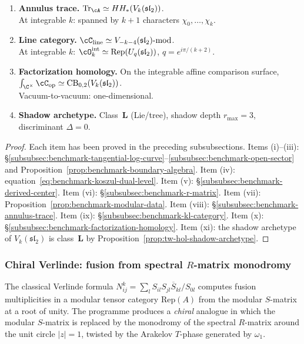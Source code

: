 \begin{theorem}
\begin{enumerate}[label=\textup{(\roman*)},nosep]
\item \textbf{Annulus trace.}
 $\mathrm{Tr}_\cA \simeq HH_*(V_k(\mathfrak{sl}_2))$.\\
 At integrable $k$: spanned by $k + 1$ characters
 $\chi_0, \ldots, \chi_k$.

\item \textbf{Line category.}
 $\cC_{\mathrm{line}} \simeq V_{-k-4}(\mathfrak{sl}_2)\text{-mod}$.\\
 At integrable $k$:
 $\cO_k^{\mathrm{int}} \simeq
 \mathrm{Rep}(U_q(\mathfrak{sl}_2))$,
 $q = e^{i\pi/(k+2)}$.

\item \textbf{Factorization homology.}
 On the integrable affine comparison surface,
 $\int_{\C^\times} \cC_{\mathrm{op}}
 \simeq \mathrm{CB}_{0,2}(V_k(\mathfrak{sl}_2))$.\\
 Vacuum-to-vacuum: one-dimensional.

\item \textbf{Shadow archetype.}
 Class~$\mathbf{L}$ \textup{(}Lie/tree\textup{)},
 shadow depth $r_{\max} = 3$, discriminant $\Delta = 0$.
\end{enumerate}
\end{theorem}

\begin{proof}
Each item has been proved in the preceding subsubsections.
Items (i)--(iii): \S\ref{subsubsec:benchmark-tangential-log-curve}--\ref{subsubsec:benchmark-open-sector}
and Proposition~\ref{prop:benchmark-boundary-algebra}.
Item (iv): equation~\eqref{eq:benchmark-koszul-dual-level}.
Item (v): \S\ref{subsubsec:benchmark-derived-center}.
Item (vi): \S\ref{subsubsec:benchmark-r-matrix}.
Item (vii): Proposition~\ref{prop:benchmark-modular-data}.
Item (viii): \S\ref{subsubsec:benchmark-annulus-trace}.
Item (ix): \S\ref{subsubsec:benchmark-kl-category}.
Item (x): \S\ref{subsubsec:benchmark-factorization-homology}.
Item (xi): the shadow archetype of $V_k(\mathfrak{sl}_2)$ is
class~$\mathbf{L}$ by Proposition~\ref{prop:tw-hol-shadow-archetype}.
\end{proof}


\subsubsection{Chiral Verlinde: fusion from spectral $R$-matrix monodromy}
\label{subsubsec:chiral-verlinde-spectral}

The classical Verlinde formula
$N^k_{ij} = \sum_l S_{il} S_{jl} \overline{S}_{kl} / S_{0l}$
computes fusion multiplicities in a modular tensor category
$\mathrm{Rep}(A)$ from the modular $S$-matrix at a root of unity.
The programme produces a \emph{chiral} analogue in which the
modular $S$-matrix is replaced by the monodromy of the spectral
$R$-matrix around the unit circle $|z|=1$, twisted by the
Arakelov $T$-phase generated by $\omega_1$.

